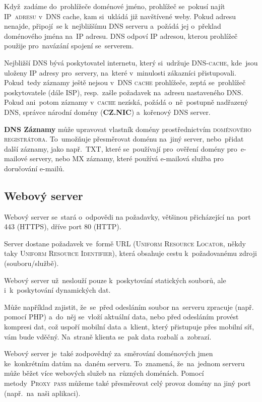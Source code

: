 \documentclass[14pt,a4paper]{article}
\begin{document}
        Když~zadáme do~prohlížeče doménové jméno, prohlížeč se~pokusí najít \textsc{IP~adresu} v~DNS cache, kam si~ukládá již navštívené weby. Pokud adresu nenajde, připojí~se k~nejbližšímu DNS serveru a~požádá jej o~překlad doménového jména na~IP adresu. DNS odpoví IP adresou, kterou prohlížeč použije pro~navázání spojení se~serverem.

        Nejbližší \textsc{DNS} bývá poskytovatel internetu, který si~udržuje \textsc{DNS-cache}, kde~jsou uloženy \textsc{IP} adresy pro~servery, na~které v~minulosti zákazníci přistupovali. Pokud~tedy záznamy ještě nejsou v~\textsc{DNS cache} prohlížeče, zeptá se~prohlížeč poskytovatele (dále \textsc{ISP}), resp.~zašle požadavek na~adresu nastaveného \textsc{DNS}. Pokud ani~potom záznamy v~\textsc{cache} nezíská, požádá o~ně~postupně nadřazený \textsc{DNS}, správce národní domény (\textbf{CZ.NIC}) a~kořenový DNS server.

        \textbf{DNS Záznamy} může upravovat vlastník domény prostřednictvím \textsc{doménového registrátora}. To~umožňuje přesměrovat doménu na~jiný server, nebo~přidat další záznamy, jako např.~\textsc{TXT}, které se~používají pro~ověření domény pro~e-mailové servery, nebo \textsc{MX} záznamy, které používá e-mailová služba pro doručování e-mailů.\parencite{dns:mdn}

        \subsection{Webový server}
        Webový server se~stará o~odpovědi na požadavky, většinou přicházející na~port 443 (\textsc{HTTPS}), dříve port 80 (\textsc{HTTP}).

        Server dostane požadavek ve~formě URL (\textsc{Uniform Resource Locator}, někdy taky \textsc{Uniform Resource Identifier}), která obsahuje cestu k~požadovanému zdroji (souboru/službě).

        Webový server už~neslouží pouze k~poskytování statických souborů, ale i~k~poskytování dynamických dat.

        Může například zajistit, že~se~před odesláním soubor na~serveru zpracuje (např. pomocí PHP) a~do~něj se~vloží aktuální data, nebo před odesláním provést kompresi dat, což uspoří mobilní data a~klient, který přistupuje přes mobilní síť, vám bude vděčný. Na~straně klienta se~pak data rozbalí a~zobrazí.

        Webový server je~také zodpovědný za~směrování doménových jmen ke~konkrétním datům na~daném serveru. To~znamená, že~na~jednom serveru může běžet více webových služeb na~různých doménách.
        Pomocí metody~\textsc{Proxy~pass} můžeme také přesměrovat celý provoz domény na jiný port (např.~na~naši aplikaci). \parencite{webserver:mdn}
\end{document}

